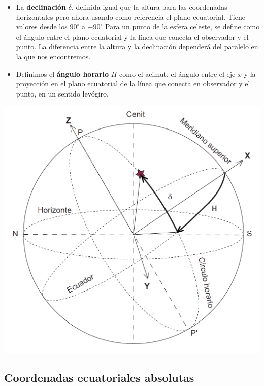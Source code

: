 \hspace{-8.0mm} \vspace{1.0mm} \begin{minipage}{0.6\textwidth}
\begin{itemize}
	\item La \textbf{declinación} $\delta$, definida igual que la altura para las coordenadas horizontales pero ahora usando como referencia el plano ecuatorial.  Tiene valores desde los $90^\circ$ a $-90^\circ$ Para un punto de la esfera celeste, se define como el ángulo entre el plano ecuatorial y la línea que conecta el observador y el punto. La diferencia entre la altura y la declinación dependerá del paralelo en la que nos encontremos. 
	\item Definimos el \textbf{ángulo horario} $H$ como el acimut, el ángulo entre el eje $x$ y la proyección en el plano ecuatorial de la línea que conecta en observador y el punto, en un sentido levógiro. 
\end{itemize}
\end{minipage}	\hfill
\begin{minipage}{0.35\textwidth} \centering
\includegraphics[width=1\textwidth]{Cuerpo/Imagenes/01_Ecuatoriales_Horarias.png}	
\end{minipage}	

\subsection{Coordenadas ecuatoriales absolutas}

